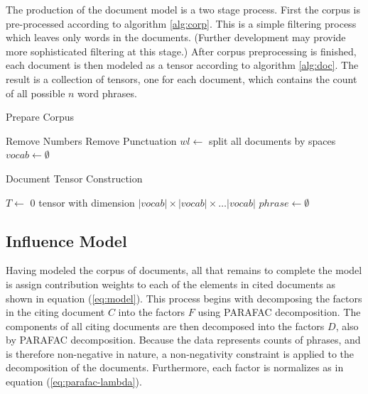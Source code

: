 \documentclass{article}
\begin{document}
The production of the document model is a two stage process.  First
the corpus is pre-processed according to algorithm \ref{alg:corp}.
This is a simple filtering process which leaves only words in the
documents.  (Further development may provide more sophisticated
filtering at this stage.)  After corpus preprocessing is finished,
each document is then modeled as a tensor according to algorithm
\ref{alg:doc}.  The result is a collection of tensors, one for each
document, which contains the count of all possible $n$ word phrases.

\begin{algorithm}
\caption{Prepare Corpus}
\label{alg:corp}
    Remove Numbers\;
    Remove Punctuation\;
    $wl \leftarrow $ split all documents by spaces\;
    $vocab \leftarrow \emptyset$\;
     {
    }
\end{algorithm}


\begin{algorithm}
\caption{Document Tensor Construction}
\label{alg:doc}
    $T \leftarrow$ 0 tensor with dimension $|vocab| \times |vocab| \times \ldots
    |vocab|$\;
    $phrase \leftarrow \emptyset$ \;
\end{algorithm}


\subsection{Influence Model}
Having modeled the corpus of documents, all that remains to complete
the model is assign contribution weights to each of the elements in
cited documents as shown in equation (\ref{eq:model}).   This process
begins with decomposing the factors in the citing document $C$ into
the factors $F$ using PARAFAC decomposition.  The components of all
citing documents are then decomposed into the factors $D$, also by
PARAFAC decomposition. Because the data represents counts of phrases,
and is therefore non-negative in nature, a non-negativity constraint
is applied to the decomposition of the documents. Furthermore, each
factor is normalizes as in equation (\ref{eq:parafac-lambda}).
\end{document}
